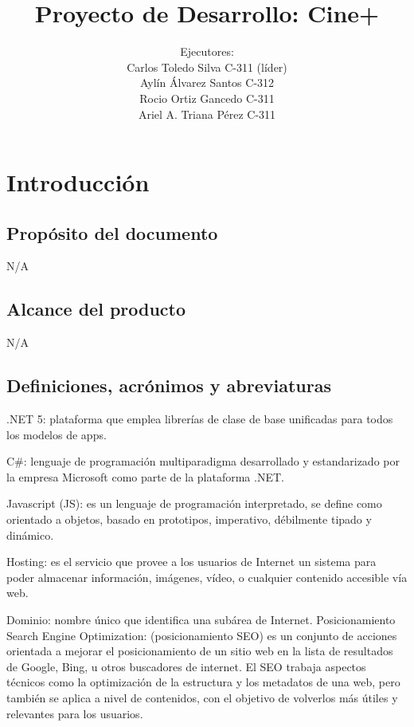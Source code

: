 \documentclass[letterpaper,12pt, oneside, onecolumn, openany]{book}
\begin{document}
	
\title{Proyecto de Desarrollo: Cine+}
\author{Ejecutores:\\
	Carlos Toledo Silva C-311 (l\'ider)\\
	Ayl\'in \'Alvarez Santos C-312\\
	Rocio Ortiz Gancedo C-311\\
	Ariel A. Triana P\'erez C-311}
\date{}
\maketitle
	
\chapter{Introducción}

\section{Prop\'osito del documento}

N/A

\section{Alcance del producto}

N/A

\section{Definiciones, acr\'onimos y abreviaturas}

.NET 5: plataforma que emplea librerías de clase de base unificadas para todos los modelos de apps.

C\#: lenguaje de programación multiparadigma desarrollado y estandarizado por la empresa Microsoft como parte de la plataforma .NET. 

Javascript (JS): es un lenguaje de programación interpretado, se define como orientado a objetos, basado en prototipos, imperativo, débilmente tipado y dinámico.

Hosting: es el servicio que provee a los usuarios de Internet un sistema para poder almacenar información, imágenes, vídeo, o cualquier contenido accesible vía web.

Dominio: nombre único que identifica una subárea de Internet.
Posicionamiento Search Engine Optimization: (posicionamiento SEO) es un conjunto de acciones orientada a mejorar el posicionamiento de un sitio web en la lista de resultados de Google, Bing, u otros buscadores de internet. El SEO trabaja aspectos técnicos como la optimización de la estructura y los metadatos de una web, pero también se aplica a nivel de contenidos, con el objetivo de volverlos más útiles y relevantes para los usuarios.
\end{document}
